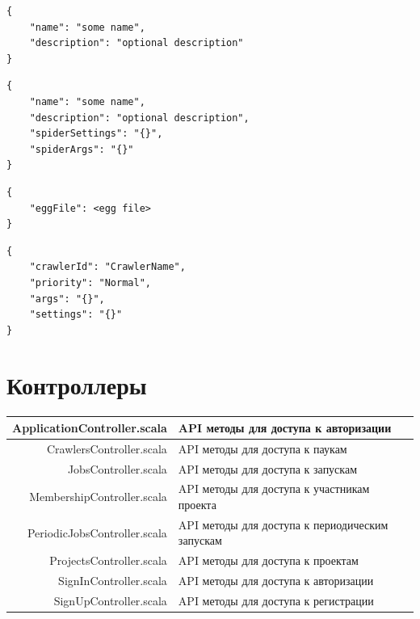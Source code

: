 \documentclass[a4paper,12pt]{article}
\begin{document}
	
	
	
	\begin{lstlisting}[frame=single, basicstyle=\footnotesize\ttfamily, label={lst:POST}, caption={JSON for POST /projects},captionpos=b]
{
    "name": "some name",
    "description": "optional description"
}
\end{lstlisting}


\begin{lstlisting}[frame=single, basicstyle=\footnotesize\ttfamily, label={lst:PUT}, caption={JSON for PUT /project},captionpos=b]
{
    "name": "some name",
    "description": "optional description",
    "spiderSettings": "{}",
    "spiderArgs": "{}"
}
\end{lstlisting}


\begin{lstlisting}[frame=single, basicstyle=\footnotesize\ttfamily, label={lst:DEPLOY}, caption={JSON for PUT /deploy},captionpos=b]
{
    "eggFile": <egg file>
}
\end{lstlisting}

\begin{lstlisting}[frame=single, basicstyle=\footnotesize\ttfamily, label={lst:POSTjob}, caption={JSON for POST /jobs},captionpos=b]
{
    "crawlerId": "CrawlerName",
    "priority": "Normal",
    "args": "{}",
    "settings": "{}"
}
\end{lstlisting}
	
	
	\section*{Контроллеры}
	
	\begin{longtable}[]{|@{\textbf}r|p{7cm}|} 
	\hline
	ApplicationController.scala & API методы для доступа к авторизации \\ \hline
CrawlersController.scala & API методы для доступа к паукам \\ \hline
JobsController.scala & API методы для доступа к запускам \\ \hline
MembershipController.scala & API методы для доступа к участникам проекта \\ \hline
PeriodicJobsController.scala & API методы для доступа к периодическим запускам \\ \hline
ProjectsController.scala & API методы для доступа к проектам \\ \hline
SignInController.scala & API методы для доступа к авторизации \\ \hline
SignUpController.scala & API методы для доступа к регистрации \\ \hline
	
	\end{longtable}
	
\end{document}
